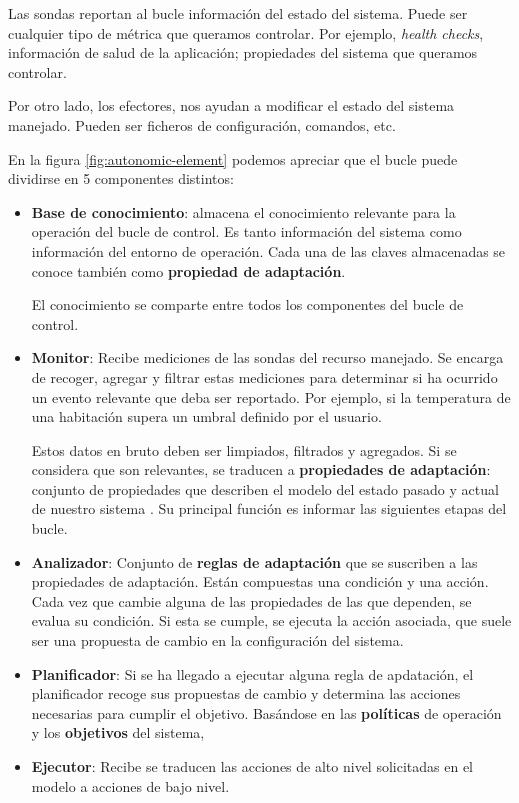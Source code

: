 Las sondas reportan al bucle información del estado del sistema. Puede ser cualquier tipo de métrica que queramos controlar. Por ejemplo, \emph{health checks}, información de salud de la aplicación; propiedades del sistema que queramos controlar.

Por otro lado, los efectores, nos ayudan a modificar el estado del sistema manejado. Pueden ser ficheros de configuración, comandos, etc.

En la figura \ref{fig:autonomic-element} podemos apreciar que el bucle puede dividirse en 5 componentes distintos: \cite{ibmcorporationArchitecturalBlueprintAutonomic2006}

\begin{itemize}
  \item \textbf{Base de conocimiento}: almacena el conocimiento relevante para la operación del bucle de control. Es tanto información del sistema como información del entorno de operación. Cada una de las claves almacenadas se conoce también como \textbf{propiedad de adaptación}.

  El conocimiento se comparte entre todos los componentes del bucle de control.

  \item \textbf{Monitor}: Recibe mediciones de las sondas del recurso manejado. Se encarga de recoger, agregar y filtrar estas mediciones para determinar si ha ocurrido un evento relevante que deba ser reportado. Por ejemplo, si la temperatura de una habitación supera un umbral definido por el usuario.

  Estos datos en bruto deben ser limpiados, filtrados y agregados. Si se considera que son relevantes, se traducen a \textbf{propiedades de adaptación}: conjunto de propiedades que describen el modelo del estado pasado y actual de nuestro sistema \cite{garlanIncreasingSystemDependability2003}. Su principal función es informar las siguientes etapas del bucle.

  \item \textbf{Analizador}: Conjunto de \textbf{reglas de adaptación} que se suscriben a las propiedades de adaptación. Están compuestas una condición y una acción. Cada vez que cambie alguna de las propiedades de las que dependen, se evalua su condición. Si esta se cumple, se ejecuta la acción asociada, que suele ser una propuesta de cambio en la configuración del sistema.

  \item \textbf{Planificador}: Si se ha llegado a ejecutar alguna regla de apdatación, el planificador recoge sus propuestas de cambio y determina las acciones necesarias para cumplir el objetivo. Basándose en las \textbf{políticas} de operación y los \textbf{objetivos} del sistema,

  \item \textbf{Ejecutor}: Recibe se traducen las acciones de alto nivel solicitadas en el modelo a acciones de bajo nivel.
\end{itemize}
